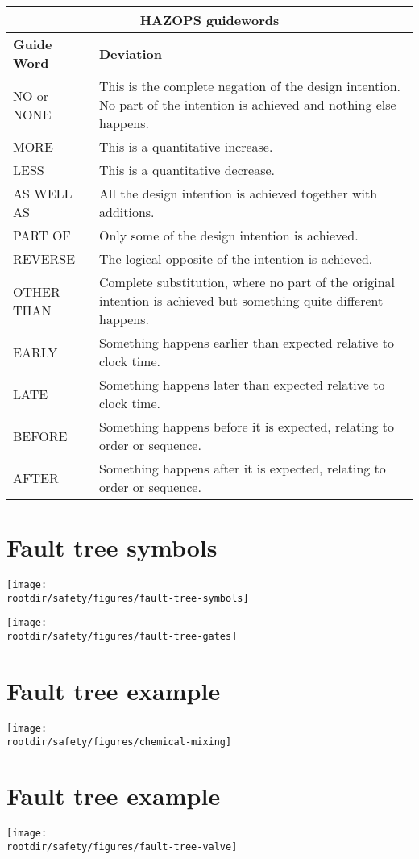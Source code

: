 \documentclass[11pt]{article}
\def\rootdir{../}
\begin{document}
\begin{center}
\begin{tabular}{lp{11cm}}
 \multicolumn{2}{c}{{\Large \textbf{HAZOPS guidewords}}}\\[2mm]
 \toprule
      \textbf{Guide Word} & \textbf{Deviation}\\
 \midrule
      NO or NONE & This is the complete negation of the design intention. No
      part of the intention is achieved and nothing else happens.\\
      MORE & This is a quantitative increase.\\
      LESS & This is a quantitative decrease.\\
      AS WELL AS & All the design intention is achieved together with additions.\\
      PART OF & Only some of the design intention is achieved. \\
      REVERSE & The logical opposite of the intention is achieved.\\
      OTHER THAN & Complete substitution, where no part of the original
      intention is achieved but something quite different happens. \\
    EARLY  & Something happens earlier than expected relative to clock time.\\
    LATE & Something happens later than expected relative to clock time. \\
    BEFORE & Something happens before it is expected, relating to
    order or sequence.\\
    AFTER & Something happens after it is expected, relating to order or sequence.\\
\bottomrule
\end{tabular}
\end{center}

\pagebreak

\section*{Fault tree symbols}

\begin{center}
  \texttt{[image: \\rootdir/safety/figures/fault-tree-symbols]}
\end{center}

\begin{center}
  \texttt{[image: \\rootdir/safety/figures/fault-tree-gates]}
\end{center}


\pagebreak

\section*{Fault tree example}

\begin{center}
  \texttt{[image: \\rootdir/safety/figures/chemical-mixing]}
\end{center}

\pagebreak

\section*{Fault tree example}

\begin{center}
  \texttt{[image: \\rootdir/safety/figures/fault-tree-valve]}
\end{center}
\end{document}
